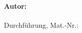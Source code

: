 \begin{titlepage}
\vspace{1.5em}
\normalsize 
\begin{center}
	\textbf{\textsf{Autor:}}\\ \vspace{0.25em}
	\SCMTauthor\\ \vspace{0.25em}
	Durchführung, Mat.-Nr.: \SCMTmatNr %
\end{center}
%


\end{titlepage}


\hypersetup{pageanchor=true}